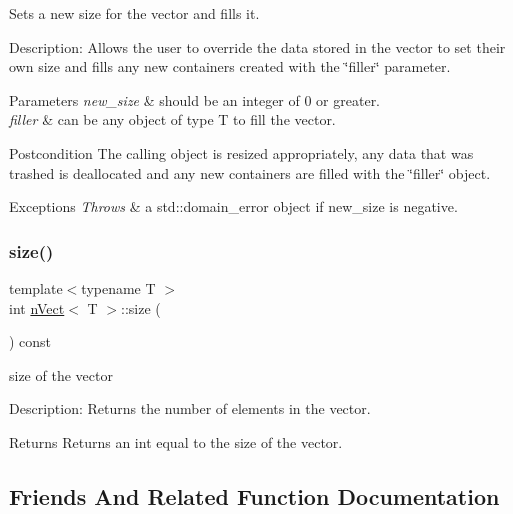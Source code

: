 Sets a new size for the vector and fills it. 

Description\+: Allows the user to override the data stored in the vector to set their own size and fills any new containers created with the \char`\"{}filler\char`\"{} parameter. 
\begin{DoxyParams}{Parameters}
{\em new\+\_\+size} & should be an integer of 0 or greater. \\
\hline
{\em filler} & can be any object of type T to fill the vector. \\
\hline
\end{DoxyParams}
\begin{DoxyPostcond}{Postcondition}
The calling object is resized appropriately, any data that was trashed is deallocated and any new containers are filled with the \char`\"{}filler\char`\"{} object. 
\end{DoxyPostcond}

\begin{DoxyExceptions}{Exceptions}
{\em Throws} & a std\+::domain\+\_\+error object if new\+\_\+size is negative. \\
\hline
\end{DoxyExceptions}
\mbox{\label{classnVect_a5cf871204b41c5cd97055b3c4ee9607c}} 
\subsubsection{\texorpdfstring{size()}{size()}}
{\footnotesize\ttfamily template$<$typename T $>$ \\
int \hyperlink{classnVect}{n\+Vect}$<$ T $>$\+::size (\begin{DoxyParamCaption}{ }\end{DoxyParamCaption}) const}



size of the vector 

Description\+: Returns the number of elements in the vector. \begin{DoxyReturn}{Returns}
Returns an int equal to the size of the vector. 
\end{DoxyReturn}


\subsection{Friends And Related Function Documentation}
\mbox{\label{classnVect_a64c439aa3f26ec0fea5c63a6e52a1be2}} 
